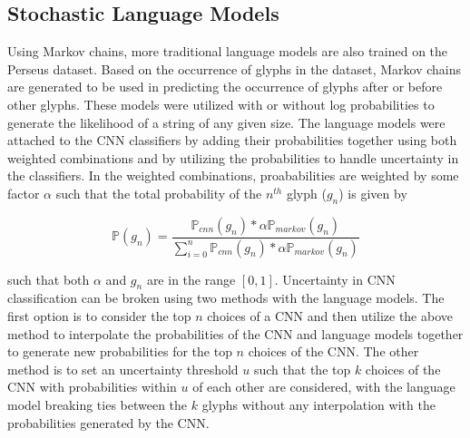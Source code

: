 \subsection{Stochastic Language Models}

Using Markov chains, more traditional language models are also trained on the Perseus dataset. Based on the occurrence of glyphs in the dataset, Markov chains are generated to be used in predicting the occurrence of glyphs after or before other glyphs. These models were utilized with or without log probabilities to generate the likelihood of a string of any given size. The language models were attached to the CNN classifiers by adding their probabilities together using both weighted combinations and by utilizing the probabilities to handle uncertainty in the classifiers. In the weighted combinations, proababilities are weighted by some factor $\alpha$ such that the total probability of the $n^{th}$ glyph ($g_n$) is given by

\begin{equation}
\mathbb{P}(g_n)=\frac{\mathbb{P}_{cnn}(g_n)*\alpha\mathbb{P}_{markov}(g_n)}{\sum_{i=0}^{n}{\mathbb{P}_{cnn}(g_n)*\alpha\mathbb{P}_{markov}(g_n)}}
\end{equation}

such that both $\alpha$ and $g_n$ are in the range $[0,1]$. Uncertainty in CNN classification can be broken using two methods with the language models. The first option is to consider the top $n$ choices of a CNN and then utilize the above method to interpolate the probabilities of the CNN and language models together to generate new probabilities for the top $n$ choices of the CNN. The other method is to set an uncertainty threshold $u$ such that the top $k$ choices of the CNN with probabilities within $u$ of each other are considered, with the language model breaking ties between the $k$ glyphs without any interpolation with the probabilities generated by the CNN.

%
